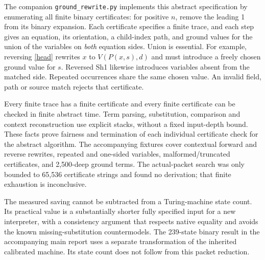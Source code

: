 \documentclass[11pt]{article}
\begin{document}
The companion \texttt{ground\_rewrite.py} implements this abstract
specification by enumerating all finite binary certificates: for positive
$n$, remove the leading 1 from its binary expansion. Each certificate
specifies a finite trace, and each step gives an equation, its orientation,
a child-index path, and ground values for the union of the variables on
\emph{both} equation sides. Union is essential. For example, reversing
\eqref{head} rewrites $x$ to $V(P(x,s),d)$ and must introduce a freely
chosen ground value for $s$. Reversed Sh1 likewise introduces variables
absent from the matched side. Repeated occurrences share the same chosen
value. An invalid field, path or source match rejects that certificate.

Every finite trace has a finite certificate and every finite certificate
can be checked in finite abstract time. Term parsing, substitution,
comparison and context reconstruction use explicit stacks, without a fixed
input-depth bound. These facts prove fairness and termination of each
individual certificate check for the abstract algorithm. The accompanying
fixtures cover contextual forward and reverse rewrites, repeated and
one-sided variables, malformed/truncated certificates, and 2,500-deep ground
terms. The actual-packet search was only bounded to 65,536 certificate
strings and found no derivation; that finite exhaustion is inconclusive.

The measured saving cannot be subtracted from a Turing-machine state count.
Its practical value is a substantially shorter fully specified input for a
new interpreter, with a consistency argument that respects native equality
and avoids the known missing-substitution countermodels. The 239-state
binary result in the accompanying main report uses a separate transformation
of the inherited calibrated machine. Its state count does not follow from
this packet reduction.
\end{document}

